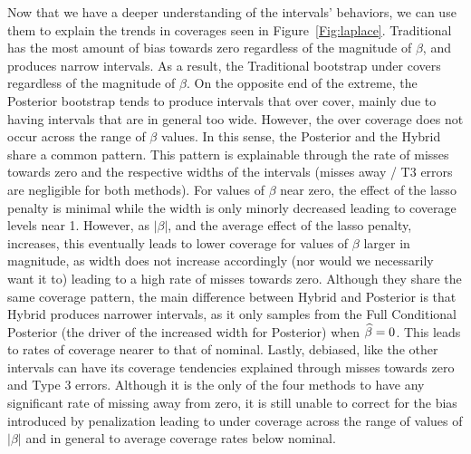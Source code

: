 
Now that we have a deeper understanding of the intervals' behaviors, we can use them to explain the trends in coverages seen in Figure~\ref{Fig:laplace}. Traditional has the most amount of bias towards zero regardless of the magnitude of $\beta$, and produces narrow intervals. As a result, the Traditional bootstrap under covers regardless of the magnitude of $\beta$. On the opposite end of the extreme, the Posterior bootstrap tends to produce intervals that over cover, mainly due to having intervals that are in general too wide. However, the over coverage does not occur across the range of $\beta$ values. In this sense, the Posterior and the Hybrid share a common pattern. This pattern is explainable through the rate of misses towards zero and the respective widths of the intervals (misses away / T3 errors are negligible for both methods). For values of $\beta$ near zero, the effect of the lasso penalty is minimal while the width is only minorly decreased leading to coverage levels near 1. However, as $|\beta|$, and the average effect of the lasso penalty, increases, this eventually leads to lower coverage for values of $\beta$ larger in magnitude, as width does not increase accordingly (nor would we necessarily want it to) leading to a high rate of misses towards zero. Although they share the same coverage pattern, the main difference between Hybrid and Posterior is that Hybrid produces narrower intervals, as it only samples from the Full Conditional Posterior (the driver of the increased width for Posterior) when $\widehat{\beta} = 0$. This leads to rates of coverage nearer to that of nominal. Lastly, debiased, like the other intervals can have its coverage tendencies explained through misses towards zero and Type 3 errors. Although it is the only of the four methods to have any significant rate of missing away from zero, it is still unable to correct for the bias introduced by penalization leading to under coverage across the range of values of $|\beta|$ and in general to average coverage rates below nominal. 

